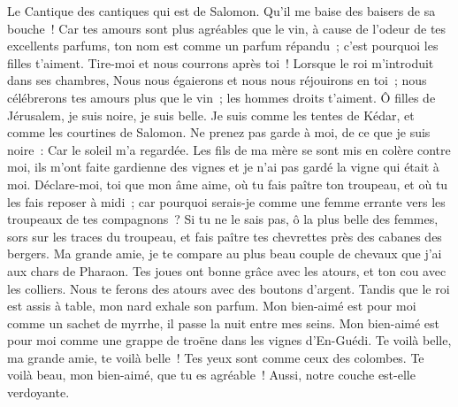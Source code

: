 \begin{multicols}{2}
\VerseOne{}Le Cantique des cantiques qui est de Salomon.
 Qu'il me baise des baisers de sa bouche~!  Car tes amours sont plus agréables que le vin,
à cause de l'odeur de tes excellents parfums, ton nom est comme un parfum répandu~; c'est pourquoi les filles t'aiment.
 Tire-moi  et nous courrons après toi~!  Lorsque le roi m'introduit dans ses chambres,  Nous nous égaierons et nous nous réjouirons en toi~; nous célébrerons tes amours plus que le vin~; les hommes droits t'aiment.
 Ô filles de Jérusalem, je suis noire, je suis belle. Je suis comme les tentes de Kédar, et comme les courtines de Salomon.
Ne prenez pas garde à moi, de ce que je suis noire~: Car le soleil m'a regardée. Les fils de ma mère se sont mis en colère contre moi, ils m'ont faite gardienne des vignes et je n'ai pas gardé la vigne qui était à moi.
Déclare-moi, toi que mon âme aime, où tu fais paître ton troupeau, et où tu les fais reposer à midi~; car pourquoi serais-je comme une femme errante vers les troupeaux de tes compagnons~?
 Si tu ne le sais pas, ô la plus belle des femmes, sors sur les traces du troupeau, et fais paître tes chevrettes près des cabanes des bergers.
Ma grande amie, je te compare au plus beau couple de chevaux que j'ai aux chars de Pharaon.
Tes joues ont bonne grâce avec les atours, et ton cou avec les colliers.
 Nous te ferons des atours avec des boutons d'argent.
 Tandis que le roi est assis à table, mon nard exhale son parfum.
Mon bien-aimé est pour moi comme un sachet de myrrhe, il passe la nuit entre mes seins.
Mon bien-aimé est pour moi comme une grappe de troëne dans les vignes d'En-Guédi.
 Te voilà belle, ma grande amie, te voilà belle~! Tes yeux sont comme ceux des colombes.
 Te voilà beau, mon bien-aimé, que tu es agréable~! Aussi, notre couche est-elle verdoyante.

\end{multicols}
